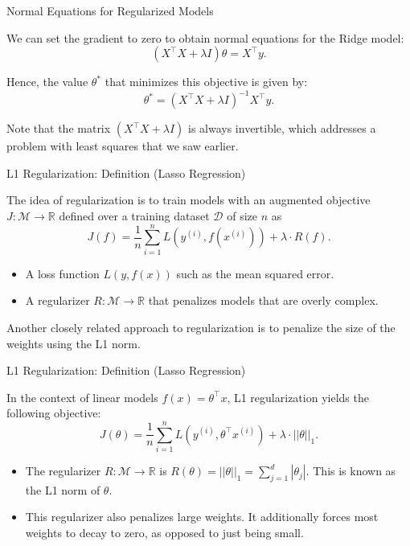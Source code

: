 \documentclass[../../main.tex]{subfiles}
\begin{document}
\begin{frame}[fragile]{Normal Equations for Regularized Models}

We can set the gradient to zero to obtain normal equations for the Ridge model:
$$ (X^\top X + \lambda I) \theta = X^\top y. $$

Hence, the value $\theta^*$ that minimizes this objective is given by:
$$ \theta^* = (X^\top X + \lambda I)^{-1} X^\top y.$$

Note that the matrix $(X^\top X + \lambda I)$ is always invertible, which addresses a problem with least squares that we saw earlier.


\end{frame}



\begin{frame}[fragile]{L1 Regularization: Definition (Lasso Regression)}

The idea of regularization is to train models with an augmented objective $J : \mathcal{M} \to \mathbb{R}$ defined over a training dataset $\mathcal{D}$ of size $n$ as
$$ J(f) = \frac{1}{n} \sum_{i=1}^n L(y^{(i)}, f(x^{(i)})) + \lambda \cdot R(f). $$

\begin{itemize}
    \item A loss function $L(y, f(x))$ such as the mean squared error.
\end{itemize}

\begin{itemize}
    \item A regularizer $R : \mathcal{M} \to \mathbb{R}$ that penalizes models that are overly complex.
\end{itemize}

Another closely related approach to regularization is to penalize the size of the weights using the L1 norm. 
\end{frame}
\begin{frame}[fragile]{L1 Regularization: Definition (Lasso Regression)}


In the context of linear models $f(x) = \theta^\top x$, L1 regularization yields the following objective:
$$ J(\theta) = \frac{1}{n} \sum_{i=1}^n L(y^{(i)}, \theta^\top x^{(i)}) + \lambda \cdot ||\theta||_1. $$

\begin{itemize}
    \item The regularizer $R : \mathcal{M} \to \mathbb{R}$ is $R(\theta) = ||\theta||_1 = \sum_{j=1}^d |\theta_j|.$ This is known as the L1 norm of $\theta$.
\end{itemize}


\begin{itemize}
    \item This regularizer also penalizes large weights. It additionally forces most weights to decay to zero, as opposed to just being small.
\end{itemize}


\end{frame} 
\end{document}

